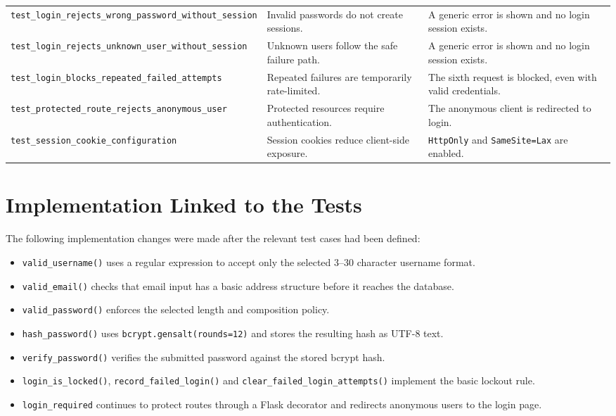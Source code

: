\documentclass[11pt,a4paper]{article}
\begin{document}
\begin{longtable}{@{}p{}p{}p{}@{}}
\texttt{test\_login\_rejects\_wrong\_password\_without\_session} & Invalid
passwords do not create sessions. & A generic error is shown and no login session
exists. \\
\texttt{test\_login\_rejects\_unknown\_user\_without\_session} & Unknown users
follow the safe failure path. & A generic error is shown and no login session
exists. \\
\texttt{test\_login\_blocks\_repeated\_failed\_attempts} & Repeated failures are
temporarily rate-limited. & The sixth request is blocked, even with valid
credentials. \\
\texttt{test\_protected\_route\_rejects\_anonymous\_user} & Protected resources
require authentication. & The anonymous client is redirected to login. \\
\texttt{test\_session\_cookie\_configuration} & Session cookies reduce
client-side exposure. & \texttt{HttpOnly} and \texttt{SameSite=Lax} are enabled. \\
\bottomrule
\end{longtable}
\normalsize

\section{Implementation Linked to the Tests}

The following implementation changes were made after the relevant test cases had
been defined:

\begin{itemize}[leftmargin=*]
    \item \texttt{valid\_username()} uses a regular expression to accept only the
    selected 3--30 character username format.
    \item \texttt{valid\_email()} checks that email input has a basic address
    structure before it reaches the database.
    \item \texttt{valid\_password()} enforces the selected length and composition
    policy.
    \item \texttt{hash\_password()} uses \texttt{bcrypt.gensalt(rounds=12)} and
    stores the resulting hash as UTF-8 text.
    \item \texttt{verify\_password()} verifies the submitted password against the
    stored bcrypt hash.
    \item \texttt{login\_is\_locked()}, \texttt{record\_failed\_login()} and
    \texttt{clear\_failed\_login\_attempts()} implement the basic lockout rule.
    \item \texttt{login\_required} continues to protect routes through a Flask
    decorator and redirects anonymous users to the login page.
\end{itemize}
\end{document}
